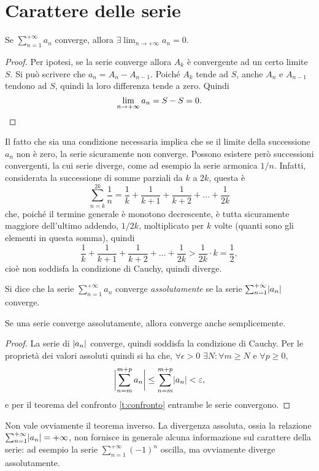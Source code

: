 \section{Carattere delle serie}
\begin{teorema}
Se $\sum_{n=1}^{+\infty}a_n$ converge, allora $\exists\lim_{n\to+\infty}a_n=0$.
\end{teorema}
\begin{proof}
Per ipotesi, se la serie converge allora $A_k$ è convergente ad un certo limite $S$. Si può scrivere che $a_n=A_n-A_{n-1}$. Poiché $A_k$ tende ad $S$, anche $A_n$ e $A_{n-1}$ tendono ad $S$, quindi la loro differenza tende a zero. Quindi
\[
\lim_{n\to+\infty}a_n=S-S=0.\qedhere
\]
\end{proof}
Il fatto che sia una condizione necessaria implica che se il limite della successione $a_n$ non è zero, la serie sicuramente non converge. Possono esistere però successioni convergenti, la cui serie diverge, come ad esempio la serie armonica $1/n$. Infatti, considerata la successione di somme parziali da $k$ a $2k$, questa è
\[
\sum_{n=k}^{2k}\frac1{n}=\frac1{k}+\frac1{k+1}+\frac1{k+2}+\dots+\frac1{2k}
\]
che, poiché il termine generale è monotono decrescente, è tutta sicuramente maggiore dell'ultimo addendo, $1/2k$, moltiplicato per $k$ volte (quanti sono gli elementi in questa somma), quindi
\[
\frac1{k}+\frac1{k+1}+\frac1{k+2}+\dots+\frac1{2k}>\frac1{2k}\cdot k=\frac12,
\]
cioè non soddisfa la condizione di Cauchy, quindi diverge.
\begin{definizione}
\label{d:conv_assoluta}
Si dice che la serie $\sum_{n=1}^{+\infty}a_n$ converge \emph{assolutamente} se la serie $\sum_{n=1}^{+\infty}\abs{a_n}$ converge.
\end{definizione}
\begin{teorema}
Se una serie converge assolutamente, allora converge anche semplicemente.
\end{teorema}
\begin{proof}
La serie di $\abs{a_n}$ converge, quindi soddisfa la condizione di Cauchy. Per le proprietà dei valori assoluti quindi si ha che, $\forall\epsilon>0$ $\exists N\colon\forall m\geq N$ e $\forall p\geq 0$,
\[
	\abs[\bigg]{\sum_{n=m}^{m+p}a_n}\leq\sum_{n=m}^{m+p}\abs{a_n}<\epsilon,
\]
e per il teorema del confronto \ref{t:confronto} entrambe le serie convergono.
\end{proof}
Non vale ovviamente il teorema inverso. La divergenza assoluta, ossia la relazione $\sum_{n=1}^{+\infty}\abs{a_n}=+\infty$, non fornisce in generale alcuna informazione sul carattere della serie: ad esempio la serie $\sum_{n=1}^{+\infty}(-1)^n$ oscilla, ma ovviamente diverge assolutamente.

